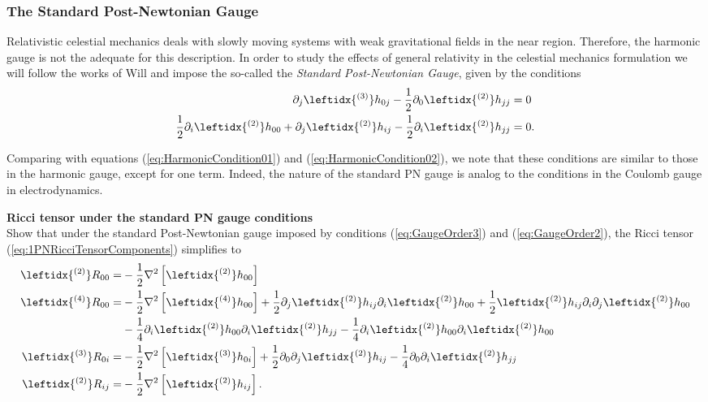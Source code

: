 \subsubsection{The Standard Post-Newtonian Gauge}
Relativistic celestial mechanics deals with slowly moving systems with weak gravitational fields in the near region. Therefore, the harmonic gauge is not the adequate for this description. In order to study the effects of general relativity in the celestial mechanics formulation we will follow the works of Will\cite{Will1993} and impose the so-called the \textit{Standard Post-Newtonian Gauge}, given by the conditions
\begin{subequations}\label{eq:StandardGaugeCondition}
\begin{align}
 \partial_j  \leftidx{ ^{(3)}} h_{0j} -  \frac{1}{2} \partial_0  \leftidx{ ^{(2)}} h_{jj} &= 0 \label{eq:GaugeOrder3} \\
\frac{1}{2} \partial_i  \leftidx{ ^{(2)}} h_{00} +  \partial_j  \leftidx{ ^{(2)}} h_{ij} - \frac{1}{2} \partial_i  \leftidx{ ^{(2)}} h_{jj} &= 0. \label{eq:GaugeOrder2}
\end{align}
\end{subequations}

Comparing with equations (\ref{eq:HarmonicCondition01}) and (\ref{eq:HarmonicCondition02}), we note that these conditions are similar to those in the harmonic gauge, except for one term. Indeed, the nature of the standard PN gauge is analog to the conditions in the Coulomb gauge in electrodynamics. 

\begin{exercise}
\textbf{Ricci tensor under the standard PN gauge conditions}\\
Show that under the standard Post-Newtonian gauge imposed by conditions (\ref{eq:GaugeOrder3}) and (\ref{eq:GaugeOrder2}), the Ricci tensor (\ref{eq:1PNRicciTensorComponents}) simplifies to
\begin{subequations}\label{eq:1PNGaugedRicciComponents}
\begin{align}
\leftidx{ ^{(2)}}R_{00} = &- \frac{1}{2} \nabla^2 \left[ \leftidx{ ^{(2)}} h_{00} \right] \\
\leftidx{ ^{(4)}}R_{00} = &- \frac{1}{2} \nabla^2 \left[ \leftidx{ ^{(4)}} h_{00} \right] + \frac{1}{2}  \partial _j \leftidx{ ^{(2)}} h_{ij} \partial _i  \leftidx{ ^{(2)}} h_{00} + \frac{1}{2} \leftidx{ ^{(2)}} h_{ij} \partial_i \partial_j \leftidx{ ^{(2)}} h_{00} \notag \\
&    - \frac{1}{4} \partial _i \leftidx{ ^{(2)}} h_{00}  \partial _i \leftidx{ ^{(2)}} h_{jj} -\frac{1}{4} \partial _i \leftidx{ ^{(2)}} h_{00}  \partial _i \leftidx{ ^{(2)}} h_{00}  \\
\leftidx{ ^{(3)}}R_{0i} = & - \frac{1}{2} \nabla^2 \left[ \leftidx{ ^{(3)}} h_{0i}\right] + \frac{1}{2} \partial_0 \partial_j \leftidx{ ^{(2)}} h_{ij} - \frac{1}{4} \partial_0 \partial_i \leftidx{ ^{(2)}} h_{jj} \\
\leftidx{ ^{(2)}}R_{ij} =& - \frac{1}{2} \nabla^2  \left[\leftidx{ ^{(2)}} h_{ij} \right].
\end{align}
\end{subequations}
\end{exercise}


